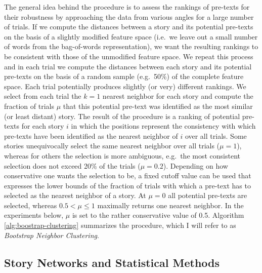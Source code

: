 The general idea behind the procedure is to assess the rankings of pre-texts for their robustness by approaching the data from various angles for a large number of trials. If we compute the distances between a story and its potential pre-texts on the basis of a slightly modified feature space (i.e.\ we leave out a small number of words from the bag-of-words representation), we want the resulting rankings to be consistent with those of the unmodified feature space. We repeat this process and in each trial we compute the distances between each story and its potential pre-texts on the basis of a random sample (e.g.~50\%) of the complete feature space. Each trial potentially produces slightly (or very) different rankings. We select from each trial the $k=1$ nearest neighbor for each story and compute the fraction of trials $\mu$ that this potential pre-text was identified as the most similar (or least distant) story. The result of the procedure is a ranking of potential pre-texts for each story $i$ in which the positions represent the consistency with which pre-texts have been identified as the nearest neighbor of $i$ over all trials. Some stories unequivocally select the same nearest neighbor over all trials ($\mu=1$), whereas for others the selection is more ambiguous, e.g.\ the most consistent selection does not exceed 20\% of the trials ($\mu=0.2$). Depending on how conservative one wants the selection to be, a fixed cutoff value can be used that expresses the lower bounds of the fraction of trials with which a pre-text has to selected as the nearest neighbor of a story. At $\mu=0$ all potential pre-texts are selected, whereas $0.5 < \mu \leq 1$ maximally returns one nearest neighbor. In the experiments below, $\mu$ is set to the rather conservative value of 0.5. Algorithm \ref{alg:boostrap-clustering} summarizes the procedure, which I will refer to as \emph{Bootstrap Neighbor Clustering}.

\subsection{Story Networks and Statistical Methods}\label{sec:construction-statistics}

